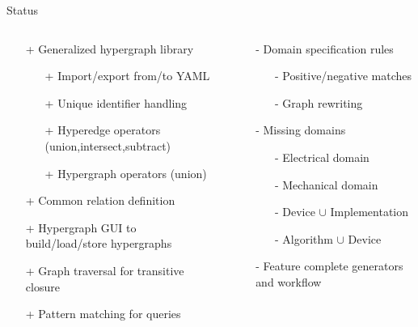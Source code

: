 \documentclass[pdf]
{beamer}
\begin{document}
\begin{frame}{Status}
    \begin{columns}
    	\begin{column}{.5\textwidth}
    		\begin{itemize}
    		\item[+] Generalized hypergraph library
    			\begin{itemize}
    			\item[+] Import/export from/to YAML
    			\item[+] Unique identifier handling
    			\item[+] Hyperedge operators (union,intersect,subtract)
    			\item[+] Hypergraph operators (union)
    			\end{itemize}
            \item[+] Common relation definition
    		\item[+] Hypergraph GUI to build/load/store hypergraphs
            \item[+] Graph traversal for transitive closure
            \item[+] Pattern matching for queries
    		\end{itemize}
    	\end{column}
    	\begin{column}{.5\textwidth}
    		\begin{itemize}
            \item[-] Domain specification rules
    			\begin{itemize}
                \item[-] Positive/negative matches
                \item[-] Graph rewriting
    			\end{itemize}
            \item[-] Missing domains
    			\begin{itemize}
                \item[-] Electrical domain
                \item[-] Mechanical domain
                \item[-] Device $\cup$ Implementation
                \item[-] Algorithm $\cup$ Device
    			\end{itemize}
    		\item[-] Feature complete generators and workflow
    		\end{itemize}
    	\end{column}
    \end{columns}
\end{frame}
\end{document}
